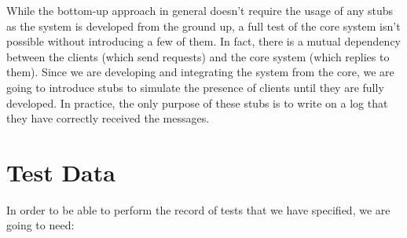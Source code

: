 \documentclass[a4paper, hidelinks, 12pt]{report}
\begin{document}
	While the bottom-up approach in general doesn't require the usage of any stubs as the system is developed from the ground up, a full test of the core system isn't possible without introducing a few of them. In fact, there is a mutual dependency between the clients (which send requests) and the core system (which replies to them). Since we are developing and integrating the system from the core, we are going to introduce stubs to simulate the presence of clients until they are fully developed. In practice, the only purpose of these stubs is to write on a log that they have correctly received the messages.

	\section{Test Data}
In order to be able to perform the record of tests that we have specified, we are going to need:
\end{document}
